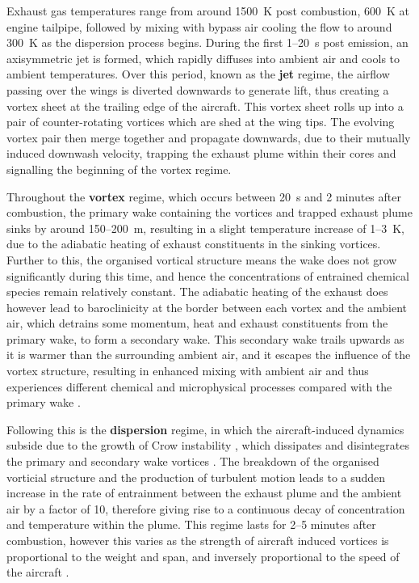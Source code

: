 Exhaust gas temperatures range from around 1500~K post combustion, 600~K at engine tailpipe, followed by mixing with bypass air cooling the flow to around 300~K \cite{Brasseur1998} as the dispersion process begins. During the first 1--20~s post emission, an axisymmetric jet is formed, which rapidly diffuses into ambient air and cools to ambient temperatures. Over this period, known as the \textbf{jet} regime, the airflow passing over the wings is diverted downwards to generate lift, thus creating a vortex sheet at the trailing edge of the aircraft. This vortex sheet rolls up into a pair of counter-rotating vortices which are shed at the wing tips. The evolving vortex pair then merge together and propagate downwards, due to their mutually induced downwash velocity, trapping the exhaust plume within their cores and signalling the beginning of the vortex regime.

Throughout the \textbf{vortex} regime, which occurs between 20~s and 2 minutes after combustion, the primary wake containing the vortices and trapped exhaust plume sinks by around 150--200~m, resulting in a slight temperature increase of 1--3~K, due to the adiabatic heating of exhaust constituents in the sinking vortices. Further to this, the organised vortical structure means the wake does not grow significantly during this time, and hence the concentrations of entrained chemical species remain relatively constant. The adiabatic heating of the exhaust does however lead to baroclinicity at the border between each vortex and the ambient air, which detrains some momentum, heat and exhaust constituents from the primary wake, to form a secondary wake. This secondary wake trails upwards as it is warmer than the surrounding ambient air, and it escapes the influence of the vortex structure, resulting in enhanced mixing with ambient air and thus experiences different chemical and microphysical processes compared with the primary wake \cite{Gerz1998}.

Following this is the \textbf{dispersion} regime, in which the aircraft-induced dynamics subside due to the growth of Crow instability \cite{Crow1970}, which dissipates and disintegrates the primary and secondary wake vortices \cite{Paoli2016}. The breakdown of the organised vorticial structure and the production of turbulent motion leads to a sudden increase in the rate of entrainment between the exhaust plume and the ambient air by a factor of 10, therefore giving rise to a continuous decay of concentration and temperature within the plume. This regime lasts for 2--5 minutes after combustion, however this varies as the strength of aircraft induced vortices is proportional to the weight and span, and inversely proportional to the speed of the aircraft \cite{Gerz1998}.

